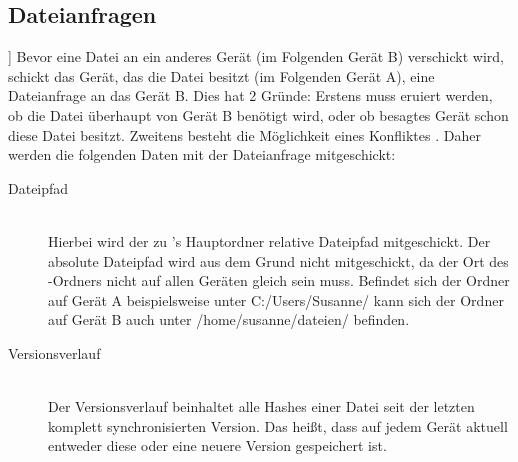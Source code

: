 \subsection{Dateianfragen}] \label{Dateianfrage}
Bevor eine Datei an ein anderes Gerät (im Folgenden Gerät B) verschickt wird, schickt das Gerät, das die Datei besitzt (im Folgenden Gerät A), eine Dateianfrage an das Gerät B. Dies hat 2 Gründe: Erstens muss eruiert werden, ob die Datei überhaupt von Gerät B benötigt wird, oder ob besagtes Gerät schon diese Datei besitzt. Zweitens besteht die Möglichkeit eines Konfliktes . Daher werden die folgenden Daten mit der Dateianfrage mitgeschickt: 
\begin{description} 
	\item[{Dateipfad}] \hfill \\
		Hierbei wird der zu \sblit's Hauptordner relative Dateipfad mitgeschickt. Der absolute Dateipfad wird aus dem Grund nicht mitgeschickt, da der Ort des \sblit-Ordners nicht auf allen Geräten gleich sein muss. Befindet sich der Ordner auf Gerät A beispielsweise unter C:/Users/Susanne/ kann sich der Ordner auf Gerät B auch unter /home/susanne/dateien/ befinden.
	\item[{Versionsverlauf}] \hfill \\
		Der Versionsverlauf beinhaltet alle Hashes einer Datei seit der letzten komplett synchronisierten Version. Das heißt, dass auf jedem Gerät aktuell entweder diese oder eine neuere Version gespeichert ist.
\end{description}
		
